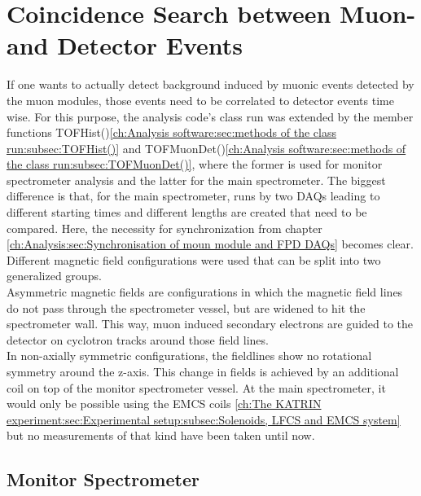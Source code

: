   \section{Coincidence Search between Muon- and Detector Events}
  \label{ch:Analysis:sec:Monitor Spectrometer Measurements}
  If one wants to actually detect background induced by muonic events detected by the muon modules, those events need to be correlated to detector events time wise. For this purpose, the analysis code's class run was extended by the member functions TOFHist()\ref{ch:Analysis software:sec:methods of the class run:subsec:TOFHist()} and TOFMuonDet()\ref{ch:Analysis software:sec:methods of the class run:subsec:TOFMuonDet()}, where the former is used for monitor spectrometer analysis and the latter for the main spectrometer. The biggest difference is that, for the main spectrometer, runs by two DAQs leading to different starting times and different lengths are created that need to be compared. Here, the necessity for synchronization from chapter \ref{ch:Analysis:sec:Synchronisation of moun module and FPD DAQs} becomes clear. Different magnetic field configurations were used that can be split into two generalized groups.\\
  Asymmetric magnetic fields are configurations in which the magnetic field lines do not pass through the spectrometer vessel, but are widened to hit the spectrometer wall. This way, muon induced secondary electrons are guided to the detector on cyclotron tracks around those field lines.\\
  In non-axially symmetric configurations, the fieldlines show no rotational symmetry around the z-axis. This change in fields is achieved by an additional coil on top of the monitor spectrometer vessel. At the main spectrometer, it would only be possible using the EMCS coils \ref{ch:The KATRIN experiment:sec:Experimental setup:subsec:Solenoids, LFCS and EMCS system} but no measurements of that kind have been taken until now.
  
  \subsection{Monitor Spectrometer}
  \label{ch:Analysis:sec:Monitor Spectrometer Measurements:subsec:Monitor Spectrometer}
  
